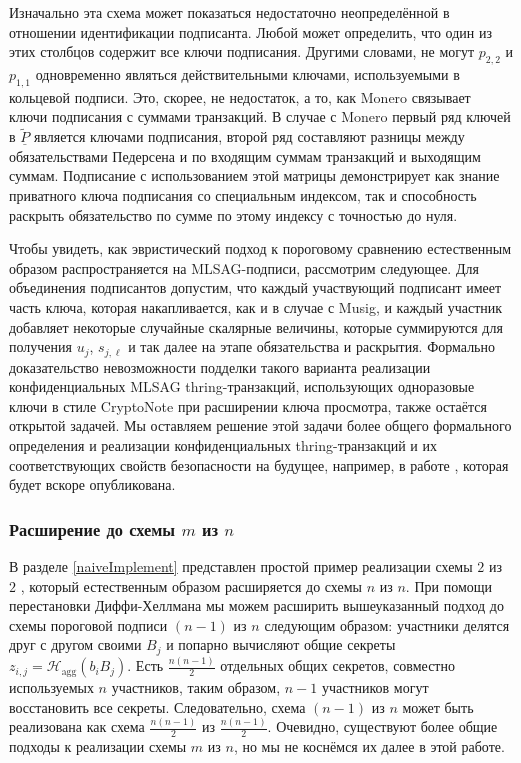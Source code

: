 \documentclass{mrl}
\theoremstyle{definition}
\numberwithin{theorem}{subsection}
\begin{document}
Изначально эта схема может показаться недостаточно неопределённой в отношении идентификации подписанта. Любой может определить, что один из этих столбцов содержит все ключи подписания. Другими словами, не могут $p_{2,2}$ и $p_{1,1}$ одновременно являться действительными ключами, используемыми в кольцевой подписи. Это, скорее, не недостаток, а то, как Monero связывает ключи подписания с суммами транзакций. В случае с Monero первый ряд ключей в $\widetilde{\underline{P}}$ является ключами подписания, второй ряд составляют разницы между обязательствами Педерсена и по входящим суммам транзакций и выходящим суммам. Подписание с использованием этой матрицы демонстрирует как знание приватного ключа подписания со специальным индексом, так и способность раскрыть обязательство по сумме по этому индексу с точностью до нуля.

Чтобы увидеть, как эвристический подход к пороговому сравнению естественным образом распространяется на MLSAG-подписи, рассмотрим следующее. Для объединения подписантов допустим, что каждый участвующий подписант имеет часть ключа, которая накапливается, как и в случае с Musig, и каждый участник добавляет некоторые случайные скалярные величины, которые суммируются для получения $u_j$, $s_{j,\ell}$ и так далее на этапе обязательства и раскрытия. Формально доказательство невозможности подделки такого варианта реализации конфиденциальных MLSAG thring-транзакций, использующих одноразовые ключи в стиле CryptoNote при расширении ключа просмотра, также остаётся открытой задачей. Мы оставляем решение этой задачи более общего формального определения и реализации конфиденциальных thring-транзакций и их соответствующих свойств безопасности на будущее, например, в работе \cite{ruffct2}, которая будет вскоре опубликована.


\subsubsection{Расширение до схемы $m$ из $n$}

В разделе \ref{naiveImplement} представлен простой пример реализации схемы $2$ из $2$ , который естественным образом расширяется до схемы $n$ из $n$. При помощи перестановки Диффи-Хеллмана мы можем расширить вышеуказанный подход до схемы пороговой подписи $(n-1)$ из $n$ следующим образом: участники делятся друг с другом своими $B_j$ и попарно вычисляют общие секреты $z_{i,j} = \mathcal{H}_{\text{agg}}(b_i B_j)$. Есть $\frac{n(n-1)}{2}$ отдельных общих секретов, совместно используемых $n$ участников, таким образом, $n-1$ участников могут восстановить все секреты. Следовательно, схема $(n-1)$ из $n$ может быть реализована как схема $\frac{n(n-1)}{2}$ из $\frac{n(n-1)}{2}$. Очевидно, существуют более общие подходы к реализации схемы $m$ из $n$, но мы не коснёмся их далее в этой работе.
\end{document}

